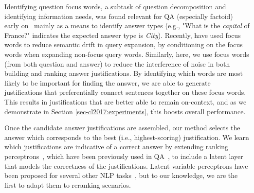 Identifying question focus words, a subtask of question decomposition and identifying information needs, was found relevant for QA (especially factoid) early on~\citep[inter alia]{Harabagiu:00,Moldovan:2003:PIE:763693.763694} mainly as a means to identify answer types (e.g., "What is the {\em capital} of France?" indicates the expected answer type is \emph{City}).  
Recently, \citet{Park:2015} have used focus words to reduce semantic drift in query expansion, by conditioning on the focus words when expanding non-focus query words.
Similarly, here, we use focus words (from both question and answer) to reduce the interference of noise in both building and ranking answer justifications.  By identifying which words are most likely to be important for finding the answer, we are able to generate justifications that preferentially connect sentences together on these focus words.  This results in justifications that are better able to remain on-context, and as we demonstrate in Section \ref{sec-cl2017:experiments}, this boosts overall performance. 

Once the candidate answer justifications are assembled, our method selects the answer which corresponds to the best (i.e., highest-scoring) justification.  We learn which justifications are indicative of a correct answer by extending ranking perceptrons~\citep{Shen:Joshi:2005}, which have been previously used in QA~\citep{Surdeanu:11}, to include a latent layer that models the correctness of the justifications. Latent-variable perceptrons have been proposed for several other NLP tasks~\citep{liang2006end,zettlemoyer2007online,sun2009latent,hoffmann2011knowledge,fernandes2012latent,bjorkelund2014learning}, but to our knowledge, we are the first to adapt them to reranking scenarios. 

